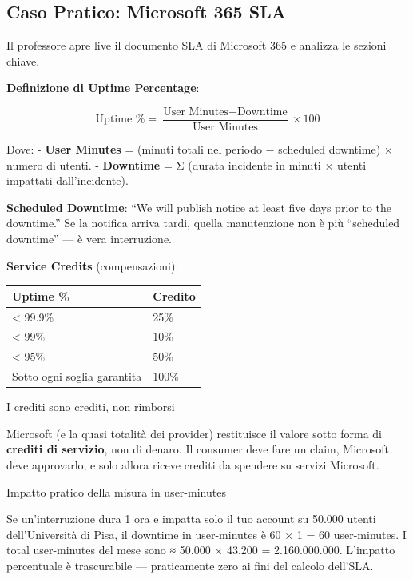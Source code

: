 \documentclass[
  italian,
  openany]{book}
\newcounter{none} %
\begin{document}
\subsection{Caso Pratico: Microsoft 365
SLA}\label{caso-pratico-microsoft-365-sla}

Il professore apre live il documento SLA di Microsoft 365 e analizza le
sezioni chiave.

\textbf{Definizione di Uptime Percentage}:

\[
\text{Uptime \%} = \frac{\text{User Minutes} - \text{Downtime}}{\text{User Minutes}} \times 100
\]

Dove: - \textbf{User Minutes} = (minuti totali nel periodo − scheduled
downtime) × numero di utenti. - \textbf{Downtime} = Σ (durata incidente
in minuti × utenti impattati dall'incidente).

\textbf{Scheduled Downtime}: ``We will publish notice at least five days
prior to the downtime.'' Se la notifica arriva tardi, quella
manutenzione non è più ``scheduled downtime'' --- è vera interruzione.

\textbf{Service Credits} (compensazioni):

{\def\LTcaptype{none} %
\begin{longtable}[]{@{}ll@{}}
\toprule\noalign{}
Uptime \% & Credito \\
\midrule\noalign{}
\endhead
\bottomrule\noalign{}
\endlastfoot
\textless{} 99.9\% & 25\% \\
\textless{} 99\% & 10\% \\
\textless{} 95\% & 50\% \\
Sotto ogni soglia garantita & 100\% \\
\end{longtable}
}

\begin{calloutnote}{I crediti sono crediti, non rimborsi}

Microsoft (e la quasi totalità dei provider) restituisce il valore sotto
forma di \textbf{crediti di servizio}, non di denaro. Il consumer deve
fare un claim, Microsoft deve approvarlo, e solo allora riceve crediti
da spendere su servizi Microsoft.

\end{calloutnote}

\begin{callouttip}{Impatto pratico della misura in user-minutes}

Se un'interruzione dura 1 ora e impatta solo il tuo account su 50.000
utenti dell'Università di Pisa, il downtime in user-minutes è 60 × 1 =
60 user-minutes. I total user-minutes del mese sono ≈ 50.000 × 43.200 =
2.160.000.000. L'impatto percentuale è trascurabile --- praticamente
zero ai fini del calcolo dell'SLA.

\end{callouttip}
\end{document}
